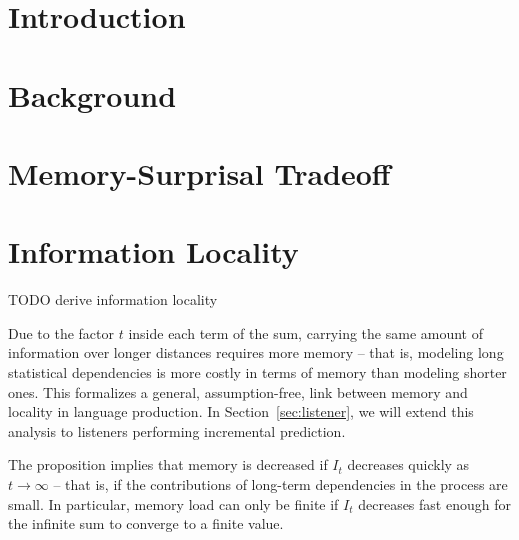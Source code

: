 \documentclass[11pt,letterpaper]{article}
\begin{document}
 
\section{Introduction}




\section{Background}\label{sec:background}




\section{Memory-Surprisal Tradeoff}\label{sec:ms-tradeoff}




\section{Information Locality}\label{sec:info-locality}

TODO derive information locality

Due to the factor $t$ inside each term of the sum, carrying the same amount of information over longer distances requires more memory -- that is, modeling long statistical dependencies is more costly in terms of memory than modeling shorter ones.
This formalizes a general, assumption-free, link between memory and locality in language production.
In Section~\ref{sec:listener}, we will extend this analysis to listeners performing incremental prediction.

The proposition implies that memory is decreased if $I_t$ decreases quickly as $t \rightarrow \infty$ -- that is, if the contributions of long-term dependencies in the process are small.
In particular, memory load can only be finite if $I_t$ decreases fast enough for the infinite sum to converge to a finite value.

\end{document}
